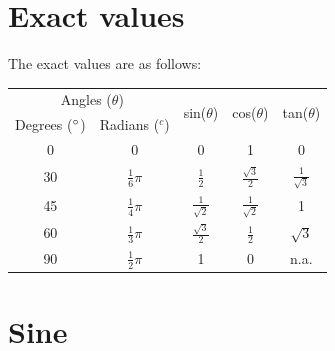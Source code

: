 \documentclass{book}
\begin{document}
\section{Exact values}
The exact values are as follows:
\begin{center}
	\begin{tabular}{c|c|c|c|c}
		\multicolumn{2}{c|}{Angles ($\theta$)}   & \multicolumn{1}{c|}{\multirow{2}{*}{sin($\theta$)}} & \multicolumn{1}{c|}{\multirow{2}{*}{cos($\theta$)}} & \multicolumn{1}{c}{\multirow{2}{*}{tan($\theta$)}}                         \\
		\multicolumn{1}{l|}{Degrees ($\degree$)} & Radians ($^c$)                                      & \multicolumn{1}{c|}{}                               & \multicolumn{1}{c|}{}                              & \multicolumn{1}{c}{}  \\
		\hline
		0                                        & \multicolumn{1}{c|}{0}                              & \multicolumn{1}{c|}{0}                              & \multicolumn{1}{c|}{1}                             & \multicolumn{1}{c}{0} \\
		\hline
		30                                       & $\frac{1}{6}\pi$                                    & $\frac{1}{2}$                                       & $\frac{\sqrt{3}}{2}$                               & $\frac{1}{\sqrt{3}}$  \\
		\hline
		45                                       & $\frac{1}{4}\pi$                                    & $\frac{1}{\sqrt{2}}$                                & $\frac{1}{\sqrt{2}}$                               & \multicolumn{1}{c}{1} \\
		\hline
		60                                       & $\frac{1}{3}\pi$                                    & $\frac{\sqrt{3}}{2}$                                & $\frac{1}{2}$                                      & $\sqrt{3}$            \\
		\hline
		90                                       & $\frac{1}{2}\pi$                                    & \multicolumn{1}{c|}{1}                              & \multicolumn{1}{c|}{0}                             & n.a.
	\end{tabular}
\end{center}

\section{Sine}
\begin{center}
\end{center}
\end{document}
